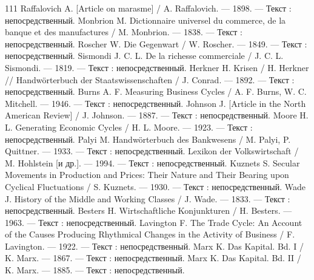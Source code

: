 \begin{RaggedRight}
\begin{thebibliography}{111}
     \hypertarget{bib:Raffalovich-1898}{} Raffalovich A. [Article on marasme] / A. Raffalovich. --- 1898. --- Текст : непосредственный.
     \hypertarget{bib:Monbrion-1838}{} Monbrion M. Dictionnaire universel du commerce, de la banque et des manufactures / M. Monbrion. --- 1838. --- Текст : непосредственный.
     \hypertarget{bib:Roscher-1849}{} Roscher W. Die Gegenwart / W. Roscher. --- 1849. --- Текст : непосредственный.
     \hypertarget{bib:Sismondi-1819}{} Sismondi J. C. L. De la richesse commerciale / J. C. L. Sismondi. --- 1819. --- Текст : непосредственный.
     \hypertarget{bib:Herkner-1892}{} Herkner H. Krisen / H. Herkner // Handwörterbuch der Staatswissenschaften / J. Conrad. --- 1892. --- Текст : непосредственный.
     \hypertarget{bib:Burns-1946}{} Burns A. F. Measuring Business Cycles / A. F. Burns, W. C. Mitchell. --- 1946. --- Текст : непосредственный.
     \hypertarget{bib:Johnson-1887}{} Johnson J. [Article in the North American Review] / J. Johnson. --- 1887. --- Текст : непосредственный.
     \hypertarget{bib:Moore-1923}{} Moore H. L. Generating Economic Cycles / H. L. Moore. --- 1923. --- Текст : непосредственный.
     \hypertarget{bib:Palyi-1933}{} Palyi M. Handwörterbuch des Bankwesens / M. Palyi, P. Quittner. --- 1933. --- Текст : непосредственный.
     \hypertarget{bib:Hohlstein-1994}{} Lexikon der Volkswirtschaft / M. Hohlstein [и др.]. --- 1994. --- Текст : непосредственный.
     \hypertarget{bib:Kuznets-1930}{} Kuznets S. Secular Movements in Production and Prices: Their Nature and Their Bearing upon Cyclical Fluctuations / S. Kuznets. --- 1930. --- Текст : непосредственный.
     \hypertarget{bib:Wade-1833}{} Wade J. History of the Middle and Working Classes / J. Wade. --- 1833. --- Текст : непосредственный.
     \hypertarget{bib:Besters-1963}{} Besters H. Wirtschaftliche Konjunkturen / H. Besters. --- 1963. --- Текст : непосредственный.
     \hypertarget{bib:Lavington-1922}{} Lavington F. The Trade Cycle: An Account of the Causes Producing Rhythmical Changes in the Activity of Business / F. Lavington. --- 1922. --- Текст : непосредственный.
     \hypertarget{bib:Marx-1867}{} Marx K. Das Kapital. Bd. I / K. Marx. --- 1867. --- Текст : непосредственный.
     \hypertarget{bib:Marx-1885}{} Marx K. Das Kapital. Bd. II / K. Marx. --- 1885. --- Текст : непосредственный.

\end{thebibliography}
\end{RaggedRight}
